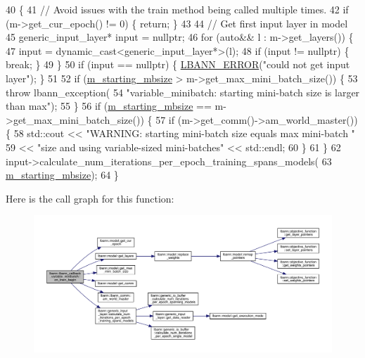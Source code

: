 \begin{DoxyCode}
40                                                                \{
41   \textcolor{comment}{// Avoid issues with the train method being called multiple times.}
42   \textcolor{keywordflow}{if} (m->get\_cur\_epoch() != 0) \{ \textcolor{keywordflow}{return}; \}
43 
44   \textcolor{comment}{// Get first input layer in model}
45   generic\_input\_layer* input = \textcolor{keyword}{nullptr};
46   \textcolor{keywordflow}{for} (\textcolor{keyword}{auto}&& l : m->get\_layers()) \{
47     input = \textcolor{keyword}{dynamic\_cast<}generic\_input\_layer*\textcolor{keyword}{>}(l);
48     \textcolor{keywordflow}{if} (input != \textcolor{keyword}{nullptr}) \{ \textcolor{keywordflow}{break}; \}
49   \}
50   \textcolor{keywordflow}{if} (input == \textcolor{keyword}{nullptr}) \{ \hyperlink{base_8hpp_a80b1d707117e968a6951b7222e4b2b87}{LBANN\_ERROR}(\textcolor{stringliteral}{"could not get input layer"}); \}
51 
52   \textcolor{keywordflow}{if} (\hyperlink{classlbann_1_1lbann__callback__variable__minibatch_a8e1a314b320f6131d0eecbff69aeb2b8}{m\_starting\_mbsize} > m->get\_max\_mini\_batch\_size()) \{
53     \textcolor{keywordflow}{throw} lbann\_exception(
54       \textcolor{stringliteral}{"variable\_minibatch: starting mini-batch size is larger than max"});
55   \}
56   \textcolor{keywordflow}{if} (\hyperlink{classlbann_1_1lbann__callback__variable__minibatch_a8e1a314b320f6131d0eecbff69aeb2b8}{m\_starting\_mbsize} == m->get\_max\_mini\_batch\_size()) \{
57     \textcolor{keywordflow}{if} (m->get\_comm()->am\_world\_master()) \{
58       std::cout << \textcolor{stringliteral}{"WARNING: starting mini-batch size equals max mini-batch "}
59                 << \textcolor{stringliteral}{"size and using variable-sized mini-batches"} << std::endl;
60     \}
61   \}
62   input->calculate\_num\_iterations\_per\_epoch\_training\_spans\_models(
63     \hyperlink{classlbann_1_1lbann__callback__variable__minibatch_a8e1a314b320f6131d0eecbff69aeb2b8}{m\_starting\_mbsize});
64 \}
\end{DoxyCode}
Here is the call graph for this function\+:\nopagebreak
\begin{figure}[H]
\begin{center}
\leavevmode
\includegraphics[width=350pt]{classlbann_1_1lbann__callback__variable__minibatch_a4f5d8ab04ab3e1cc3aa66327d3712f51_cgraph}
\end{center}
\end{figure}
